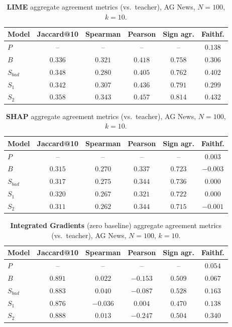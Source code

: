 \documentclass[conference]{IEEEtran}
\begin{document}
\begin{table}[h!]
\centering
\caption{\textbf{LIME} aggregate agreement metrics (vs.\ teacher), AG News, $N=100$, $k=10$.}
\footnotesize
\begin{tabular}{|l|c|c|c|c|c|}
\hline
Model & Jaccard@10 & Spearman & Pearson & Sign agr. & Faithf. \\ \hline
$P$ & -- & -- & -- & -- & $0.138$ \\
$B$ & $0.336$ & $0.321$ & $0.418$ & $0.758$ & $0.306$ \\
$S_{bad}$ & $0.348$ & $0.280$ & $0.405$ & $0.762$ & $0.402$ \\
$S_1$ & $0.342$ & $0.307$ & $0.436$ & $0.791$ & $0.299$ \\
$S_2$ & $0.358$ & $0.343$ & $0.457$ & $0.814$ & $0.432$ \\ \hline
\end{tabular}
\label{tab:agnews_lime_agg}
\end{table}

\begin{table}[h!]
\centering
\caption{\textbf{SHAP} aggregate agreement metrics (vs.\ teacher), AG News, $N=100$, $k=10$.}
\footnotesize
\begin{tabular}{|l|c|c|c|c|c|}
\hline
Model & Jaccard@10 & Spearman & Pearson & Sign agr. & Faithf. \\ \hline
$P$ & -- & -- & -- & -- & $0.003$ \\
$B$ & $0.315$ & $0.270$ & $0.337$ & $0.723$ & $-0.003$ \\
$S_{bad}$ & $0.317$ & $0.275$ & $0.344$ & $0.736$ & $0.000$ \\
$S_1$ & $0.320$ & $0.267$ & $0.321$ & $0.722$ & $0.000$ \\
$S_2$ & $0.311$ & $0.262$ & $0.344$ & $0.715$ & $-0.001$ \\ \hline
\end{tabular}
\label{tab:agnews_shap_agg}
\end{table}

\begin{table}[h!]
\centering
\caption{\textbf{Integrated Gradients} (zero baseline) aggregate agreement metrics (vs.\ teacher), AG News, $N=100$, $k=10$.}
\footnotesize
\begin{tabular}{|l|c|c|c|c|c|}
\hline
Model & Jaccard@10 & Spearman & Pearson & Sign agr. & Faithf. \\ \hline
$P$ & -- & -- & -- & -- & $0.054$ \\
$B$ & $0.891$ & $0.022$ & $-0.153$ & $0.509$ & $0.067$ \\
$S_{bad}$ & $0.883$ & $0.040$ & $-0.087$ & $0.528$ & $0.163$ \\
$S_1$ & $0.876$ & $-0.036$ & $0.004$ & $0.470$ & $0.138$ \\
$S_2$ & $0.888$ & $0.013$ & $-0.247$ & $0.504$ & $0.340$ \\ \hline
\end{tabular}
\label{tab:agnews_ig_agg}
\end{table}
\end{document}
